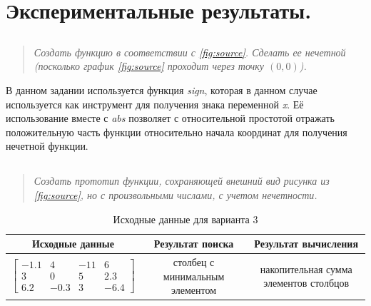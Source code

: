 \section*{Экспериментальные результаты.}
\subsection*{  }

\begin{quote}
    \textit{Создать функцию в соответствии с \cref{fig:source}. Сделать ее нечетной (посколько график \cref{fig:source} проходит через точку $(0, 0)$). }
\end{quote}


В данном задании используется функция \textit{sign}, которая в данном случае используется как инструмент для получения знака переменной \textit{x}.
Её использование вместе с \textit{abs} позволяет с относительной простотой отражать положительную часть функции относительно начала координат для получения нечетной функции.


\subsection*{  }

\begin{quote}
    \textit{Создать прототип функции, сохраняющей внешний вид рисунка из \cref{fig:source}, но с произвольными числами, с учетом нечетности.}
\end{quote}

\begin{table}[hbt]
    \centering
    \caption{Исходные данные для варианта 3}
    \label{table:source}
    \begin{tabularx}{\linewidth}{cCC}
        Исходные данные & Результат поиска & Результат вычисления \\
        \toprule

        $$
            \begin{bmatrix}
                -1.1 & 4    & -11 & 6    \\
                3    & 0    & 5   & 2.3  \\
                6.2  & -0.3 & 3   & -6.4
            \end{bmatrix}
        $$
        & столбец с минимальным элементом & накопительная сумма элементов столбцов \\
    \end{tabularx}
\end{table}

